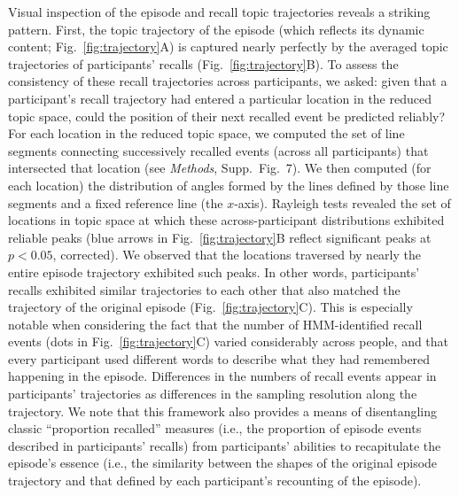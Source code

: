 \documentclass[10pt]{article}
\newcommand{\arrows}{7}
\begin{document}
Visual inspection of the episode and recall topic trajectories reveals a striking pattern.  First, the topic trajectory of the episode (which reflects its dynamic content; Fig.~\ref{fig:trajectory}A) is captured nearly perfectly by the averaged topic trajectories of participants' recalls (Fig.~\ref{fig:trajectory}B).  To assess the consistency of these recall trajectories across participants, we asked: given that a participant's recall trajectory had entered a particular location in the reduced topic space, could the position of their next recalled event be predicted reliably?  For each location in the reduced topic space, we computed the set of line segments connecting successively recalled events (across all participants) that intersected that location (see \textit{Methods}, Supp.\ Fig.~\arrows).  We then computed (for each location) the distribution of angles formed by the lines defined by those line segments and a fixed reference line (the $x$-axis).  Rayleigh tests revealed the set of locations in topic space at which these across-participant distributions exhibited reliable peaks (blue arrows in Fig.~\ref{fig:trajectory}B reflect significant peaks at $p < 0.05$, corrected).  We observed that the locations traversed by nearly the entire episode trajectory exhibited such peaks.  In other words, participants' recalls exhibited similar trajectories to each other that also matched the trajectory of the original episode (Fig.~\ref{fig:trajectory}C).  This is especially notable when considering the fact that the number of HMM-identified recall events (dots in Fig.~\ref{fig:trajectory}C) varied considerably across people, and that every participant used different words to describe what they had remembered happening in the episode.  Differences in the numbers of recall events appear in participants' trajectories as differences in the sampling resolution along the trajectory.  We note that this framework also provides a means of disentangling classic ``proportion recalled'' measures (i.e., the proportion of episode events described in participants' recalls) from participants' abilities to recapitulate the episode's essence (i.e., the similarity between the shapes of the original episode trajectory and that defined by each participant's recounting of the episode).
\end{document}
